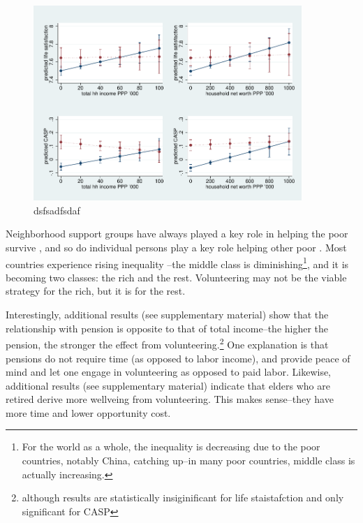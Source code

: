 \documentclass[10pt, letterpaper]{article}
\begin{document}
\begin{spacing}{1.4}
\begin{figure}[h!]
  \centering
\includegraphics[width=4in]{regDmarg.pdf}  
  \caption{dsfsadfsdaf}
  \label{mar}
\end{figure}




Neighborhood support groups have always played a key role in helping the poor
survive \citep{saegert2002social}, and so do individual persons play a key role
helping other poor \citep{mazelis2017surviving}. Most countries experience
rising inequality \citep{piketty03,mackintosh13,oecd08,verbeek15}--the middle
class is diminishing\footnote{For the world as a whole, the inequality is
  decreasing due to the poor countries, notably China, catching up--in many poor
  countries, middle class is actually increasing.}, and it is becoming two classes: the rich and the
rest. Volunteering may not be the viable strategy for the rich, but it is for the rest. 


Interestingly, additional results (see supplementary material) show that the
relationship with pension is opposite to that of total income--the higher the
pension, the stronger the effect from volunteering.\footnote{although results are
statistically insiginificant for life staistafction and only significant for CASP} One explanation is that
pensions do not require time (as opposed to labor income), and provide peace of
mind and let one engage in volunteering as opposed to paid labor. 
Likewise, additional results (see supplementary material) indicate that elders
who are retired derive more wellveing from volunteering. This makes sense--they
have more time and lower opportunity cost. 



\end{spacing}
\end{document}

